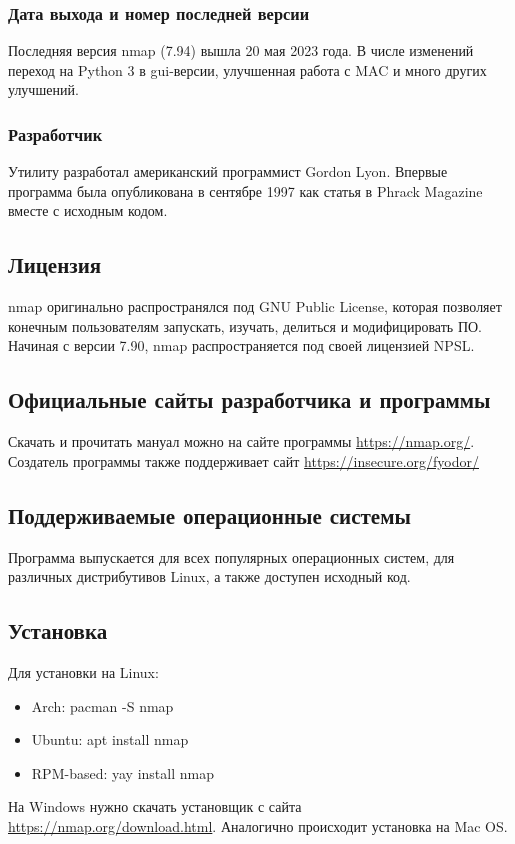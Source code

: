 \subsubsection{Дата выхода и номер последней версии}
Последняя версия nmap (7.94) вышла 20 мая 2023 года. В числе изменений переход на Python 3 в gui-версии, улучшенная работа с MAC и много других улучшений.

\subsubsection{Разработчик}
Утилиту разработал американский программист Gordon Lyon. Впервые программа была опубликована в сентябре 1997 как статья в Phrack Magazine вместе с исходным кодом.

\clearpage

\subsection{Лицензия}
nmap оригинально распространялся под GNU Public License, которая позволяет конечным пользователям запускать, изучать, делиться и модифицировать ПО. Начиная с версии 7.90, nmap распространяется под своей лицензией NPSL.

\subsection{Официальные сайты разработчика и программы}
Скачать и прочитать мануал можно на сайте программы \url{https://nmap.org/}. Создатель программы также поддерживает сайт \url{https://insecure.org/fyodor/}

\subsection{Поддерживаемые операционные системы}
Программа выпускается для всех популярных операционных систем, для различных дистрибутивов Linux, а также доступен исходный код.

\subsection{Установка}
Для установки на Linux:
\begin{itemize}
    \item Arch: pacman -S nmap
    \item Ubuntu: apt install nmap
    \item RPM-based: yay install nmap
\end{itemize}
На Windows нужно скачать установщик с сайта \url{https://nmap.org/download.html}. Аналогично происходит установка на Mac OS.

